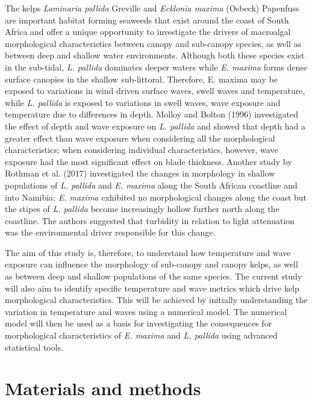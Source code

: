\documentclass[
  a4paper,
]{article}
\begin{document}
The kelps \emph{Laminaria pallida} Greville and \emph{Ecklonia maxima}
(Osbeck) Papenfuss are important habitat forming seaweeds that exist
around the coast of South Africa and offer a unique opportunity to
investigate the drivers of macroalgal morphological characteristics
between canopy and sub-canopy species, as well as between deep and
shallow water environments. Although both these species exist in the
sub-tidal, \emph{L. pallida} dominates deeper waters while \emph{E.
maxima} forms dense surface canopies in the shallow sub-littoral.
Therefore, E. maxima may be exposed to variations in wind driven surface
waves, swell waves and temperature, while \emph{L. pallida} is exposed
to variations in swell waves, wave exposure and temperature due to
differences in depth. Molloy and Bolton (1996) investigated the effect
of depth and wave exposure on \emph{L. pallida} and showed that depth
had a greater effect than wave exposure when considering all the
morphological characteristics; when considering individual
characteristics, however, wave exposure had the most significant effect
on blade thickness. Another study by Rothman et al. (2017) investigated
the changes in morphology in shallow populations of \emph{L. pallida}
and \emph{E. maxima} along the South African coastline and into Namibia;
\emph{E. maxima} exhibited no morphological changes along the coast but
the stipes of \emph{L. pallida} become increasingly hollow further north
along the coastline. The authors suggested that turbidity in relation to
light attenuation was the environmental driver responsible for this
change.

The aim of this study is, therefore, to understand how temperature and
wave exposure can influence the morphology of sub-canopy and canopy
kelps, as well as between deep and shallow populations of the same
species. The current study will also aim to identify specific
temperature and wave metrics which drive kelp morphological
characteristics. This will be achieved by initially understanding the
variation in temperature and waves using a numerical model. The
numerical model will then be used as a basis for investigating the
consequences for morphological characteristics of \emph{E. maxima} and
\emph{L. pallida} using advanced statistical tools.

\hypertarget{materials-and-methods}{%
\section{Materials and methods}\label{materials-and-methods}}
\end{document}
